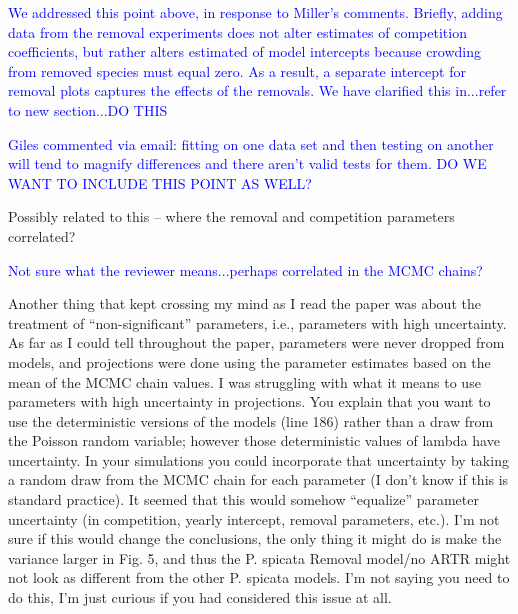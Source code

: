 \documentclass[12pt]{article}
\newcommand{\response}{\textcolor{blue}}
\begin{document}
\response{We addressed this point above, in response to Miller's comments. Briefly, adding data from the removal experiments does not alter estimates of competition coefficients, but rather alters estimated of model intercepts because crowding from removed species must equal zero. As a result, a separate intercept for removal plots captures the effects of the removals. We have clarified this in...refer to new section...DO THIS}

\response{Giles commented via email: fitting on one data set and then testing on another will tend to magnify differences and there aren’t valid tests for them. DO WE WANT TO INCLUDE THIS POINT AS WELL? }

Possibly related to this – where the removal and competition parameters correlated?

\response{Not sure what the reviewer means...perhaps correlated in the MCMC chains?}

Another thing that kept crossing my mind as I read the paper was about the treatment of “non-significant” parameters, i.e., parameters with high uncertainty. As far as I could tell throughout the paper, parameters were never dropped from models, and projections were done using the parameter estimates based on the mean of the MCMC chain values. I was struggling with what it means to use parameters with high uncertainty in projections. You explain that you want to use the deterministic versions of the models (line 186) rather than a draw from the Poisson random variable; however those deterministic values of lambda have uncertainty. In your simulations you could incorporate that uncertainty by taking a random draw from the MCMC chain for each parameter (I don't know if this is standard practice). It seemed that this would somehow “equalize” parameter uncertainty (in competition, yearly intercept, removal parameters, etc.). I’m not sure if this would change the conclusions, the only thing it might do is make the variance larger in Fig. 5, and thus the P. spicata Removal model/no ARTR might not look as different from the other P. spicata models. I’m not saying you need to do this, I’m just curious if you had considered this issue at all.
\end{document}
